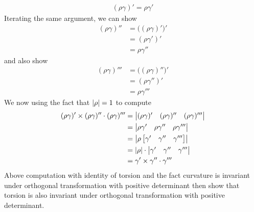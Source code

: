 \documentclass{report}
\begin{document}
\begin{align*}
 (\rho \gamma )'=\rho \gamma '
\end{align*}
Iterating the same argument, we can show
\begin{align*}
  (\rho \gamma )''&=\big((\rho \gamma )' \big)'\\
  &=(\rho \gamma ')'\\
  &=\rho \gamma ''
\end{align*}
and also show
\begin{align*}
  (\rho \gamma )'''&= \big((\rho \gamma )'' \big)'\\
  &=(\rho \gamma '')'\\
  &=\rho \gamma '''
\end{align*}
We now using the fact that $\left|\rho\right|=1$ to compute  
\begin{align*}
  (\rho \gamma )' \times (\rho \gamma )'' \cdot (\rho \gamma )'''&= \begin{vmatrix} 
    (\rho \gamma )' & (\rho \gamma )'' & (\rho \gamma )'''
  \end{vmatrix}\\
 &=\begin{vmatrix}  \rho \gamma ' & \rho \gamma '' & \rho \gamma'''\end{vmatrix}\\
 &=\begin{vmatrix} 
\rho \begin{bmatrix}
  \gamma ' & \gamma '' & \gamma '''
\end{bmatrix}
 \end{vmatrix}\\
 &=\left|\rho\right|\cdot \begin{vmatrix} 
   \gamma ' & \gamma '' & \gamma '''
 \end{vmatrix}\\
 &=\gamma ' \times \gamma '' \cdot \gamma '''
\end{align*}
Above computation with identity of torsion and the fact curvature is invariant under orthogonal transformation with positive determinant then show that torsion is also invariant under orthogonal transformation with positive determinant.\\
\end{document}
